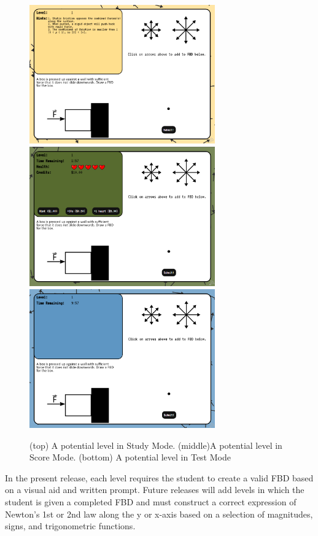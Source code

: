 \documentclass[12pt]{article}
\begin{document}
\begin{figure}
    \centering
    \includegraphics[width=8cm]{studyModeLevelScreen.png}
    \includegraphics[width=8cm]{scoreModeLevelScreen.png}
    \includegraphics[width=8cm]{testModeLevelScreen.png}
    \caption{(top) A potential level in Study Mode. (middle)A potential level in Score Mode. (bottom) A potential level in Test Mode}
\end{figure}
In the present release, each level requires the student to create a valid FBD based on a visual aid and written prompt. Future releases will add levels in which the student is given a completed FBD and must construct a correct expression of Newton's 1st or 2nd law along the y or x-axis based on a selection of magnitudes, signs, and trigonometric functions.\par
\end{document}
